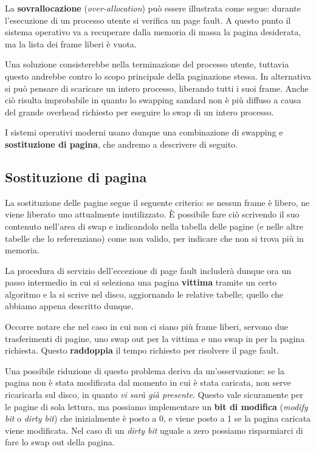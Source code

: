     La \textbf{sovrallocazione} (\textit{over-allocation}) può essere illustrata come segue: durante l'esecuzione di un processo utente si verifica un page fault. A questo punto il sistema operativo va a recuperare dalla memoria di massa la pagina desiderata, ma la lista dei frame liberi è vuota.
    
    Una soluzione consisterebbe nella terminazione del processo utente, tuttavia questo andrebbe contro lo scopo principale della paginazione stessa. In alternativa si può pensare di scaricare un intero processo, liberando tutti i suoi frame. Anche ciò risulta improbabile in quanto lo swapping sandard non è più diffuso a causa del grande overhead richiesto per eseguire lo swap di un intero processo.
    
    I sistemi operativi moderni usano dunque una combinazione di swapping e \textbf{sostituzione di pagina}, che andremo a descrivere di seguito.
    
    \subsection{Sostituzione di pagina}
        La sostituzione delle pagine segue il seguente criterio: se nessun frame è libero, ne viene liberato uno attualmente inutilizzato. È possibile fare ciò scrivendo il suo contenuto nell'area di swap e indicandolo nella tabella delle pagine (e nelle altre tabelle che lo referenziano) come non valido, per indicare che non si trova più in memoria.
        
        La procedura di servizio dell'eccezione di page fault includerà dunque ora un passo intermedio in cui si seleziona una pagina \textbf{vittima} tramite un certo algoritmo e la si scrive nel disco, aggiornando le relative tabelle; quello che abbiamo appena descritto dunque.
        
        Occorre notare che nel caso in cui non ci siano più frame liberi, servono due trasferimenti di pagine, uno swap out per la vittima e uno swap in per la pagina richiesta. Questo \textbf{raddoppia} il tempo richiesto per risolvere il page fault.
        
        Una possibile riduzione di questo problema deriva da un'osservazione: se la pagina non è stata modificata dal momento in cui è stata caricata, non serve ricaricarla sul disco, in quanto \textit{vi sarà già presente}. Questo vale sicuramente per le pagine di sola lettura, ma possiamo implementare un \textbf{bit di modifica} (\textit{modify bit} o \textit{dirty bit}) che inizialmente è posto a 0, e viene posto a 1 se la pagina caricata viene modificata. Nel caso di un \textit{dirty bit} uguale a zero possiamo risparmiarci di fare lo swap out della pagina.
        
